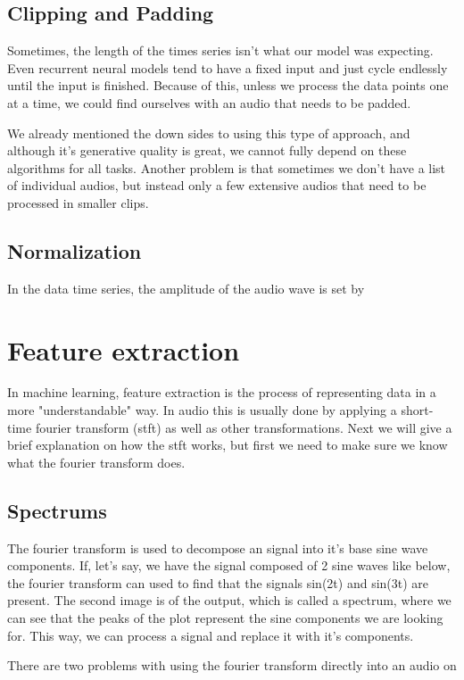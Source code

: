 \documentclass{book}
\begin{document}
\subsection{Clipping and Padding}
\qquad Sometimes, the length of the times series isn't what our model was expecting.
Even recurrent neural models tend to have a fixed input and just cycle endlessly until the input is finished.
Because of this, unless we process the data points one at a time, we could find ourselves with an audio that needs to be padded.
\par
We already mentioned the down sides to using this type of approach, and although it's generative quality is great, we cannot fully depend on these algorithms for all tasks.
Another problem is that sometimes we don't have a list of individual audios, but instead only a few extensive audios that need to be processed in smaller clips.
\par
\subsection{Normalization}
In the data time series, the amplitude of the audio wave is set by 
\section{Feature extraction}
\qquad In machine learning, feature extraction is the process of representing data in a more "understandable" way.
In audio this is usually done by applying a short-time fourier transform (stft) as well as other transformations.
Next we will give a brief explanation on how the stft works, but first we need to make sure we know what the fourier transform does.
\subsection{Spectrums}
\qquad The fourier transform is used to decompose an signal into it's base sine wave components.
If, let's say, we have the signal composed of 2 sine waves like below, the fourier transform can used to find that the signals sin(2t) and sin(3t) are present.
The second image is of the output, which is called a spectrum, where we can see that the peaks of the plot represent the sine components we are looking for.
This way, we can process a signal and replace it with it's components.
\par
There are two problems with using the fourier transform directly into an audio  on 
\end{document}

